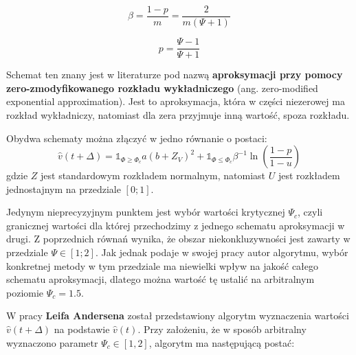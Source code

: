 \documentclass{pracamgr}
\begin{document}
\begin{equation}
\label{eq:beta}
\beta = \frac{1-p}{m} = \frac{2}{m(\Psi + 1)}
\end{equation}

\begin{equation}
\label{eq:p}
p = \frac{\Psi - 1}{\Psi + 1}
\end{equation}

Schemat ten znany jest w literaturze pod nazwą \textbf{aproksymacji przy pomocy 
zero-zmodyfikowanego rozkładu wykładniczego} (ang. zero-modified exponential approximation). 
Jest to aproksymacja, która w części niezerowej ma 
rozkład wykładniczy, natomiast dla zera przyjmuje inną wartość, spoza rozkładu. 


Obydwa schematy można złączyć w jedno równanie o postaci:
\begin{equation}
\label{eq:andersen}
\hat{v}(t + \Delta)  = \mathds{1}_{\Phi \geq \Phi_c} a (b + Z_V)^2
 + \mathds{1}_{\Phi \le \Phi_c} \beta^{-1} \ln (\frac{1-p}{1-u})
\end{equation}
gdzie $Z$ jest standardowym rozkładem normalnym, natomiast $U$ jest rozkładem jednostajnym na 
przedziale $[0;1]$.


Jedynym nieprecyzyjnym punktem jest wybór wartości krytycznej $\Psi_c$, czyli granicznej wartości dla 
której przechodzimy z jednego schematu aproksymacji w drugi. 
Z poprzednich równań wynika, że obszar niekonkluzywności jest zawarty w przedziale $\Psi \in [1;2]$.
Jak jednak podaje w swojej pracy autor algorytmu, wybór konkretnej metody w tym przedziale ma 
niewielki wpływ na jakość całego schematu aproksymacji, dlatego można wartość tę ustalić na 
arbitralnym poziomie $\Psi_c = 1.5$. 
 


W pracy \textbf{Leifa Andersena} \cite{Andersen} został 
przedstawiony algorytm wyznaczenia 
wartości $\hat{v}(t + \Delta)$ na podstawie $\hat{v}(t)$. Przy założeniu, 
że w sposób arbitralny wyznaczono parametr $\Psi_c \in [1,2]$, algorytm 
ma następującą postać:
\end{document}
